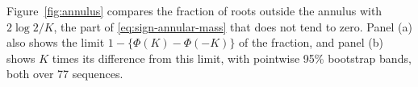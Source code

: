 Figure~\ref{fig:annulus} compares the fraction of roots outside the
annulus with $2\log2/K$, the part of \eqref{eq:sign-annular-mass} that
does not tend to zero.
Panel (a) also shows the limit $1-\{\Phi(K)-\Phi(-K)\}$ of the fraction,
and panel (b) shows $K$ times its difference from this limit, with
pointwise 95\% bootstrap bands, both over 77 sequences.


